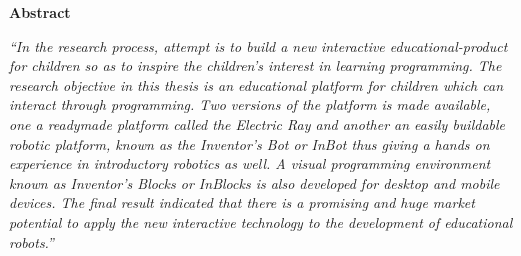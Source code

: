 
\begin{center}
\textbf{\large Abstract}
\end{center}

\emph{``In the research process, attempt is to build a new interactive educational-product for children so as to inspire the children's interest in learning programming. The research objective in this thesis is an educational platform for children which can interact through programming. Two versions of the platform is made available, one a readymade platform called the Electric Ray and another an easily buildable robotic platform, known as the Inventor's Bot or InBot thus giving a hands on experience in introductory robotics as well. A visual programming environment known as Inventor's Blocks or InBlocks is also developed for desktop and mobile devices. The final result indicated that there is a promising and huge market potential to apply the new interactive technology to the development of educational robots.''}

